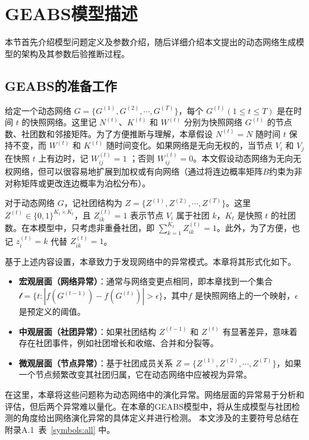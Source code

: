 \section{GEABS模型描述\label{chap4:model}}

\label{sec:method}
本节首先介绍模型问题定义及参数介绍，随后详细介绍本文提出的动态网络生成模型的架构及其参数后验推断过程。


\subsection{GEABS的准备工作}
给定一个动态网络 $G =\{ G^{(1)}, G^{(2)}, \cdots, G^{(T)} \}$，每个 $G^{(t)} (1 \le t \le T)$ 是在时间 $t$ 的快照网络。这里记 $N^{(t)}$、$K^{(t)}$ 和 $W^{(t)}$ 分别为快照网络 $G^{(t)}$ 的节点数、社团数和邻接矩阵。为了方便推断与理解，本章假设 $N^{(t)} = N$ 随时间 $t$ 保持不变，而 $W^{(t)}$ 和 $K^{(t)}$ 随时间变化。如果网络是无向无权的，当节点 $V_i$ 和 $V_j$ 在快照 $t$ 上有边时，记 $W^{(t)}_{ij} = 1$ ；否则 $W^{(t)}_{ij} = 0$。本文假设动态网络为无向无权网络，但可以很容易地扩展到加权或有向网络（通过将连边概率矩阵$B$约束为非对称矩阵或更改连边概率为泊松分布）。

对于动态网络 $G$，记社团结构为 $Z = \{ Z^{(1)}, Z^{(2)}, \cdots, Z^{(T)} \}$。这里 $Z^{(t)} \in \{0, 1 \}^{K_t \times K_t}$，且 $Z^{(t)}_{ik} = 1$ 表示节点 $V_i$ 属于社团 $k$，$K_t$ 是快照 $t$ 的社团数。在本模型中，只考虑非重叠社团，即 $\sum_{k=1}^{K_t} Z^{(t)}_{ik} = 1$。此外，为了方便，也记 $z^{(t)}_{i} = k$ 代替 $Z^{(t)}_{ik} = 1$。



基于上述内容设置，本章致力于发现网络中的异常模式。本章将其形式化如下。
\begin{itemize}
    \item \textbf{宏观层面（网络异常）}：通常与网络变更点相同，即本章找到一个集合 $\mathcal{t} = \{t : |f(G^{(t-1)}) -f(G^{(t)})| > \epsilon  \} $，其中$f$ 是快照网络上的一个映射，$\epsilon$是预定义的阈值。
    \item \textbf{中观层面（社团异常）}：如果社团结构 $Z^{(t-1)}$ 和 $Z^{(t)}$ 有显著差异，意味着存在社团事件，例如社团增长和收缩、合并和分裂等。
    \item \textbf{微观层面（节点异常）}：基于社团成员关系 $Z = \{ Z^{(1)}, Z^{(2)}, \cdots, Z^{(T)} \}$，如果一个节点频繁改变其社团归属，它在动态网络中应被视为异常。
\end{itemize}

在这里，本章将这些问题称为动态网络中的演化异常。网络层面的异常易于分析和评估，但后两个异常难以量化。在本章的GEABS模型中，将从生成模型与社团检测的角度给出网络演化异常的具体定义并进行检测。
本文涉及的主要符号总结在附录A.1~表~\ref{symbols:all} 中。

